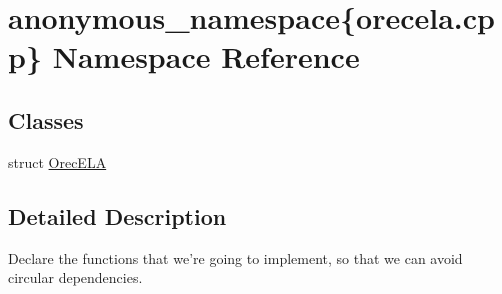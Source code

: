 \hypertarget{namespaceanonymous__namespace_02orecela_8cpp_03}{\section{anonymous\-\_\-namespace\{orecela.\-cpp\} Namespace Reference}
\label{namespaceanonymous__namespace_02orecela_8cpp_03}
}
\subsection*{Classes}
\begin{DoxyCompactItemize}
\item 
struct \hyperlink{structanonymous__namespace_02orecela_8cpp_03_1_1OrecELA}{Orec\-E\-L\-A}
\end{DoxyCompactItemize}


\subsection{Detailed Description}
Declare the functions that we're going to implement, so that we can avoid circular dependencies. 